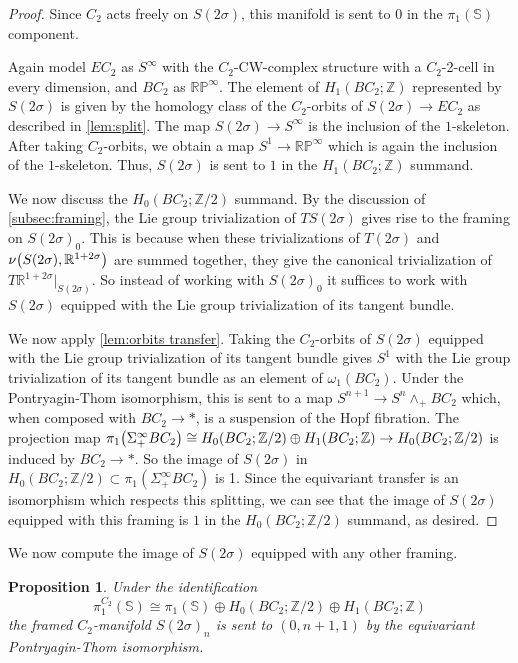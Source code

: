 \documentclass[11pt]{amsart}
\newcommand{\R}{\mathbb R}
\newcommand{\Z}{\mathbb{Z}}
\newcommand{\Sph}{\mathbb{S}}
\newcommand{\RP}{\mathbb{RP}}
\theoremstyle{plain}   %
\newtheorem{prop}[thm]{Proposition}
\theoremstyle{definition}
\theoremstyle{remark}
\numberwithin{equation}{section}
\let\originalleft\left
\let\originalright\right
\renewcommand{\left}{\mathopen{}\mathclose\bgroup\originalleft}
\renewcommand{\right}{\aftergroup\egroup\originalright}
\begin{document}
\begin{proof}
Since $C_2$ acts freely on $S(2\sigma)$, this manifold is sent to $0$ in the $\pi_1(\Sph)$ component. 

Again model $EC_2$ as $S^\infty$ with the $C_2$-CW-complex structure with a $C_2$-2-cell in every dimension, and $BC_2$ as $\RP^\infty$. The element of $H_1(BC_2;\Z)$ represented by $S(2\sigma)$ is given by the homology class of the $C_2$-orbits of $S(2\sigma)\to EC_2$ as described in \cref{lem:split}. The map $S(2\sigma)\to S^\infty$  is the inclusion of the $1$-skeleton. After taking $C_2$-orbits, we obtain a map $S^1\to \RP^\infty$ which is again the inclusion of the $1$-skeleton. Thus, $S(2\sigma)$ is sent to $1$ in the $H_1(BC_2;\Z)$ summand. 

We now discuss the $H_0(BC_2;\Z/2)$ summand. By the discussion of \cref{subsec:framing}, the Lie group trivialization of $TS(2\sigma)$ gives rise to the framing on $S(2\sigma)_0$. This is because when these trivializations of $T(2\sigma)$ and $\nu\left(S(2\sigma),\R^{1+2\sigma}\right)$ are summed together, they give the canonical trivialization of $T\R^{1+2\sigma}|_{S(2\sigma)}$. So instead of working with $S(2\sigma)_0$ it suffices to work with $S(2\sigma)$ equipped with the Lie group trivialization of its tangent bundle. 

We now apply \cref{lem:orbits transfer}. Taking the $C_2$-orbits of $S(2\sigma)$ equipped with the Lie group trivialization of its tangent bundle gives $S^1$ with the Lie group trivialization of its tangent bundle as an element of $\omega_1(BC_2)$. Under the Pontryagin-Thom isomorphism, this is sent to a map $S^{n+1}\to S^n\wedge_+ BC_2$ which, when composed with $BC_2\to *$, is a suspension of the Hopf fibration. The projection map $\pi_1\left(\Sigma_+^\infty BC_2\right)\cong H_0(BC_2;\Z/2)\oplus H_1(BC_2;\Z) \to H_0(BC_2;\Z/2)$ is induced by $BC_2\to *$. So the image of $S(2\sigma)$ in $H_0(BC_2;\Z/2)\subset \pi_1(\Sigma_+^\infty BC_2)$ is 1. Since the equivariant transfer is an isomorphism which respects this splitting, we can see that the image of $S(2\sigma)$ equipped with this framing is $1$ in the $H_0(BC_2;\Z/2)$ summand, as desired. 
\end{proof}

We now compute the image of $S(2\sigma)$ equipped with any other framing.


\begin{prop}
Under the identification 
\[
\pi_1^{C_2}(\Sph)\cong \pi_1(\Sph)\oplus H_0(BC_2;\Z/2)\oplus H_1(BC_2;\Z)
\]
the framed $C_2$-manifold $S(2\sigma)_n$ is sent to $(0,n+1,1)$ by the equivariant Pontryagin-Thom isomorphism.
\end{prop}
\end{document}
